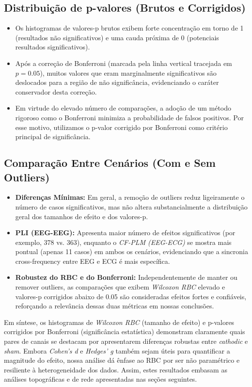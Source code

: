 \subsection{Distribuição de p-valores (Brutos e Corrigidos)}

\begin{itemize}
    \item Os histogramas de valores-p brutos exibem forte concentração em torno de 1 (resultados não significativos) e uma cauda próxima de 0 (potenciais resultados significativos).
    \item Após a correção de Bonferroni (marcada pela linha vertical tracejada em $p=0.05$), muitos valores que eram marginalmente significativos são deslocados para a região de não significância, evidenciando o caráter conservador desta correção.
    \item Em virtude do elevado número de comparações, a adoção de um método rigoroso como o Bonferroni minimiza a probabilidade de falsos positivos. Por esse motivo, utilizamos o p-valor corrigido por Bonferroni como critério principal de significância.
\end{itemize}

\subsection{Comparação Entre Cenários (Com e Sem Outliers)}
\begin{itemize}
    \item \textbf{Diferenças Mínimas:} Em geral, a remoção de outliers reduz ligeiramente o número de casos significativos, mas não altera substancialmente a distribuição geral dos tamanhos de efeito e dos valores-p.
    \item \textbf{PLI (EEG-EEG):} Apresenta maior número de efeitos significativos (por exemplo, 378 vs. 363), enquanto o \emph{CF-PLM (EEG-ECG)} se mostra mais pontual (apenas 11 casos) em ambos os cenários, evidenciando que a sincronia cross-frequency entre EEG e ECG é mais específica.
    \item \textbf{Robustez do RBC e do Bonferroni:} Independentemente de manter ou remover outliers, as comparações que exibem \emph{Wilcoxon RBC} elevado e valores-p corrigidos abaixo de 0.05 são consideradas efeitos fortes e confiáveis, reforçando a relevância dessas duas métricas em nossas conclusões.
\end{itemize}

Em síntese, os histogramas de \emph{Wilcoxon RBC} (tamanho de efeito) e p-valores corrigidos por Bonferroni (significância estatística) demonstram claramente quais pares de canais se destacam por apresentarem diferenças robustas entre \emph{cathodic} e \emph{sham}. Embora \emph{Cohen's d} e \emph{Hedges' g} também sejam úteis para quantificar a magnitude do efeito, nossa análise dá ênfase ao RBC por ser não paramétrico e resiliente à heterogeneidade dos dados. Assim, estes resultados embasam as análises topográficas e de rede apresentadas nas seções seguintes.


